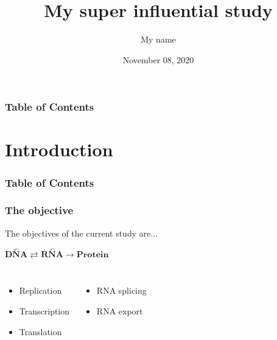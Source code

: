 \documentclass{beamer}
\begin{document}
%
%
\title{My super influential study}

\author{My name}


\date{November 08, 2020}


\begin{frame}[plain]
  \titlepage

\end{frame}



%
\begin{frame}
  \frametitle{Table of Contents}
  \tableofcontents
\end{frame}
%

\section{Introduction}

  \begin{frame}
    \frametitle{Table of Contents}
    \tableofcontents[currentsection]
  \end{frame}

  \begin{frame}
    \frametitle{The objective}
    \centering
    The objectives of the current study are... \pause
    \newline
    \newline

    \(\overset{\curvearrowleft}{\textbf{DNA}}
    \rightleftarrows \overset{\curvearrowleft}{\textbf{RNA}}
    \rightarrow \textbf{Protein}\)

    \pause
    \begin{columns}

      \begin{itemize}
        \item Replication \pause
        \item Transcription \pause
        \item Translation \pause
      \end{itemize}

      \begin{itemize}
        \item RNA splicing \pause
        \item RNA export
      \end{itemize}
    \end{columns}

  \end{frame}
\end{document}
